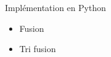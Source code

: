 \documentclass[10pt]{beamer}
\begin{document}
\begin{frame}[fragile]{\Ctitle}{\stitle}
	\begin{exampleblock}{Implémentation en Python}
		\begin{itemize}
			\item Fusion
			\item Tri fusion
		\end{itemize}
	\end{exampleblock}
\end{frame}
\end{document}
